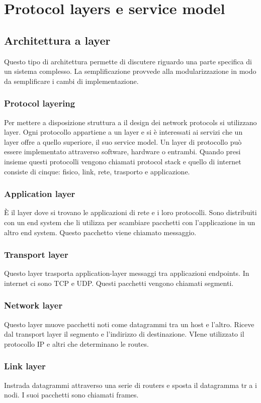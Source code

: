 \section{Protocol layers e service model}
\subsection{Architettura a layer}
Questo tipo di architettura permette di discutere riguardo una parte specifica di un sistema complesso. La semplificazione provvede alla modularizzazione in modo da semplificare i cambi di implementazione.
\subsubsection{Protocol layering}
Per mettere a disposizione struttura a il design dei network protocols si utilizzano layer. Ogni protocollo appartiene a un layer e si \`e interessati ai servizi che un layer offre a quello superiore, il suo service 
model. Un layer di protocollo pu\`o essere implementato attraverso software, hardware o entrambi. Quando presi insieme questi protocolli vengono chiamati protocol stack e quello di internet consiste di 
cinque: fisico, link, rete, trasporto e applicazione. 
\subsubsection{Application layer}
\`E il layer dove si trovano le applicazioni di rete e i loro protocolli. Sono distribuiti con un end system che li utilizza per scambiare pacchetti con l'applicazione in un altro end system. Questo pacchetto viene
chiamato messaggio.
\subsubsection{Transport layer}
Questo layer trasporta application-layer messaggi tra applicazioni endpoints. In internet ci sono TCP e UDP. Questi pacchetti vengono chiamati segmenti.
\subsubsection{Network layer}
Questo layer muove pacchetti noti come datagrammi tra un host e l'altro. Riceve dal transport layer il segmento e l'indirizzo di destinazione. VIene utilizzato il protocollo IP e altri che determinano le routes.
\subsubsection{Link layer}
Instrada datagrammi attraverso una serie di routers e sposta il datagramma tr a i nodi. I suoi pacchetti sono chiamati frames.
